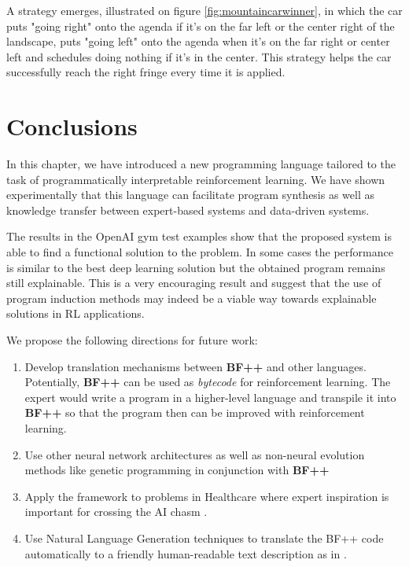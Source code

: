 A strategy emerges, illustrated on figure \ref{fig:mountaincarwinner}, in which the car puts "going right" onto the agenda if it's on the far left or the center right of the landscape, puts "going left" onto the agenda when it's on the far right or center left and schedules doing nothing if it's in the center.
This strategy helps the car successfully reach the right fringe every time it is applied.

\newpage
\section{Conclusions}

In this chapter, we have introduced a new programming language tailored to the task of programmatically interpretable reinforcement learning.
We have shown experimentally that this language can facilitate program synthesis as well as knowledge transfer between expert-based systems and data-driven systems. 

The results in the OpenAI gym test examples show that the proposed system is able to find a functional solution to the problem. In some cases the performance is similar to the best deep learning solution but the obtained program remains still explainable. This is a very encouraging result and suggest that the use of program induction methods may indeed be a viable way towards explainable solutions in RL applications. 

We propose the following directions for future work:
\begin{enumerate}
    \item Develop translation mechanisms between \textbf{BF++} and other languages. Potentially, \textbf{BF++} can be used as \emph{bytecode} \cite{bytecode} for reinforcement learning. The expert would write a program in a higher-level language and transpile it into \textbf{BF++} so that the program then can be improved with reinforcement learning.
    \item Use other neural network architectures as well as non-neural evolution methods like genetic programming \cite{genprog1,genprog2} in conjunction with \textbf{BF++}
    \item Apply the framework to problems in Healthcare where expert inspiration is important for crossing the AI chasm \cite{aichasm}.    \item Use Natural Language Generation techniques to translate the BF++ code automatically to a friendly human-readable text description as in \cite{richardsonCode2TextChallengeText2017,code2nlg2}.
\end{enumerate}
